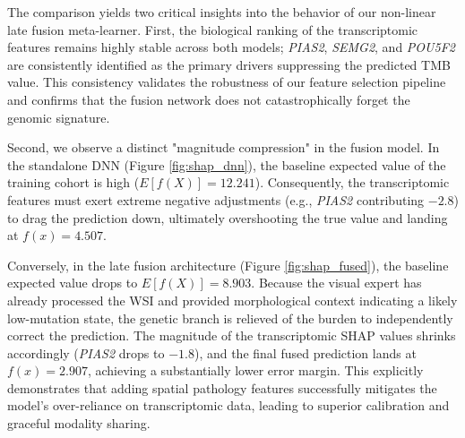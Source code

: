 \documentclass[11pt,a4paper]{article}
\begin{document}
The comparison yields two critical insights into the behavior of our non-linear late fusion meta-learner. First, the biological ranking of the transcriptomic features remains highly stable across both models; \textit{PIAS2}, \textit{SEMG2}, and \textit{POU5F2} are consistently identified as the primary drivers suppressing the predicted TMB value. This consistency validates the robustness of our feature selection pipeline and confirms that the fusion network does not catastrophically forget the genomic signature.

Second, we observe a distinct "magnitude compression" in the fusion model. In the standalone DNN (Figure \ref{fig:shap_dnn}), the baseline expected value of the training cohort is high ($E[f(X)] = 12.241$). Consequently, the transcriptomic features must exert extreme negative adjustments (e.g., \textit{PIAS2} contributing $-2.8$) to drag the prediction down, ultimately overshooting the true value and landing at $f(x) = 4.507$.

Conversely, in the late fusion architecture (Figure \ref{fig:shap_fused}), the baseline expected value drops to $E[f(X)] = 8.903$. Because the visual expert has already processed the WSI and provided morphological context indicating a likely low-mutation state, the genetic branch is relieved of the burden to independently correct the prediction. The magnitude of the transcriptomic SHAP values shrinks accordingly (\textit{PIAS2} drops to $-1.8$), and the final fused prediction lands at $f(x) = 2.907$, achieving a substantially lower error margin. This explicitly demonstrates that adding spatial pathology features successfully mitigates the model's over-reliance on transcriptomic data, leading to superior calibration and graceful modality sharing.

\end{document}
